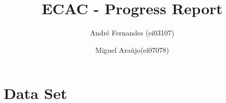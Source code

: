\documentclass[a4paper,12pt]{article}
\title{ECAC - Progress Report}
\author{André Fernandes (ei03107) \and Miguel Araújo(ei07078)}
\begin{document}
\maketitle

\section{Data Set}
\end{document}
